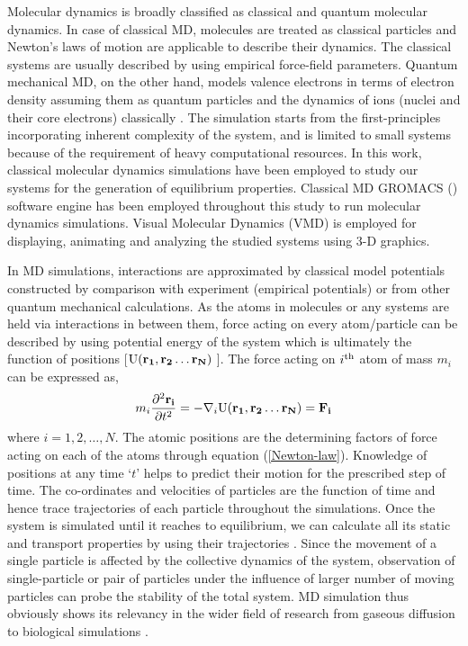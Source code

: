 Molecular dynamics is broadly classified as classical and quantum molecular dynamics. In case of classical MD, molecules are treated as classical particles and Newton's laws of motion are applicable to describe their dynamics. The classical systems are usually described by using empirical force-field parameters. Quantum mechanical MD, on the other hand, models valence electrons in terms of electron density assuming them as quantum particles and the dynamics of ions (nuclei and their core electrons) classically \citep{Car1985, Marx2009, Barnett1993}. The simulation starts from the first-principles incorporating inherent complexity of the system, and is limited to small systems because of the requirement of heavy computational resources. In this work, classical molecular dynamics simulations have been employed to study  our systems  for the generation of equilibrium properties. Classical MD GROMACS (\citep{Gromacs-manual})  software engine has been employed throughout this study to run molecular dynamics simulations. Visual Molecular Dynamics (VMD) is employed for displaying, animating and analyzing the studied systems using  3-D graphics.

In MD simulations, interactions are approximated by classical model potentials constructed by comparison with experiment (empirical potentials) or from other quantum mechanical calculations. As the atoms in molecules or any systems are held via interactions in between them, force acting on every atom/particle can be described by using potential energy of the system which is ultimately the function of positions [${\rm U}(\mathbf{r_1, r_2 \ldots r_N})\ $]. The force acting on $i^{\rm th}$ atom of mass $m_i$ can be expressed as,  
\begin{equation}\label{Newton-law}
 m_i \frac {\partial^2 \mathbf{r_i}}{\partial t^2} = -\nabla_i {\rm U}(\mathbf{r_1, r_2 \ldots r_N}) = \mathbf{F_i}
\end{equation}
where $i = 1,2,\ldots,N$. The atomic positions are the determining factors of force acting on each of the atoms through equation (\ref{Newton-law}). Knowledge of positions at any time `{\it $t$}' helps to predict their motion for the prescribed step of time. The co-ordinates and velocities of particles are the function of time and hence trace trajectories of each particle throughout the simulations. Once the system is simulated until it reaches to equilibrium, we can calculate all its  static and transport properties by using their trajectories \citep{Frenkel2002}. Since the movement of a single particle is affected by the collective dynamics of the system, observation of single-particle or pair of particles under the influence of larger number of moving particles can probe the stability of the total system. MD simulation thus obviously shows its relevancy in the wider field of research from gaseous diffusion \citep{Poudyal2014, Pokhrel2016} to biological simulations \citep{Shimizu2002}. 

